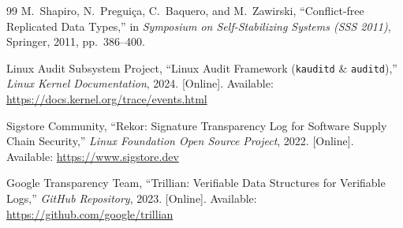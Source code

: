 \documentclass{article}
\begin{document}
\begin{thebibliography}{99}
M.~Shapiro, N.~Pregui\c{c}a, C.~Baquero, and M.~Zawirski,
``Conflict-free Replicated Data Types,''
in \emph{Symposium on Self-Stabilizing Systems (SSS 2011)}, Springer, 2011, pp.~386--400.

Linux Audit Subsystem Project,
``Linux Audit Framework (\texttt{kauditd} \& \texttt{auditd}),''
\emph{Linux Kernel Documentation}, 2024. [Online]. Available: \url{https://docs.kernel.org/trace/events.html}

Sigstore Community,
``Rekor: Signature Transparency Log for Software Supply Chain Security,''
\emph{Linux Foundation Open Source Project}, 2022. [Online]. Available: \url{https://www.sigstore.dev}

Google Transparency Team,
``Trillian: Verifiable Data Structures for Verifiable Logs,''
\emph{GitHub Repository}, 2023. [Online]. Available: \url{https://github.com/google/trillian}

\end{thebibliography}
\end{document}
